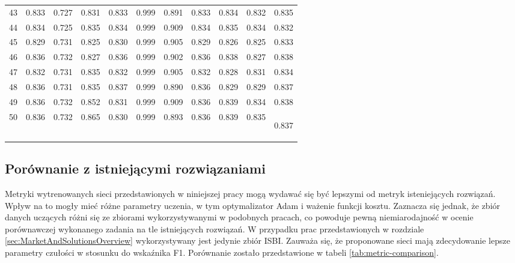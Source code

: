 \begin{longtable}[p]{|c|c|c|c|c|c|c|c|c|c|c|}
	43 & 0.833 & 0.727 & 0.831 & 0.833 & 0.999 & 0.891 & 0.833 & 0.834 & 0.832 & 0.835\\
	44 & 0.834 & 0.725 & 0.835 & 0.834 & 0.999 & 0.909 & 0.834 & 0.835 & 0.834 & 0.832\\
	45 & 0.829 & 0.731 & 0.825 & 0.830 & 0.999 & 0.905 & 0.829 & 0.826 & 0.825 & 0.833\\
	46 & 0.836 & 0.732 & 0.827 & 0.836 & 0.999 & 0.902 & 0.836 & 0.838 & 0.827 & 0.838\\
	47 & 0.832 & 0.731 & 0.835 & 0.832 & 0.999 & 0.905 & 0.832 & 0.828 & 0.831 & 0.834\\
	48 & 0.836 & 0.731 & 0.835 & 0.837 & 0.999 & 0.890 & 0.836 & 0.829 & 0.829 & 0.837\\
	49 & 0.836 & 0.732 & 0.852 & 0.831 & 0.999 & 0.909 & 0.836 & 0.839 & 0.834 & 0.838\\
	50 & 0.836 & 0.732 & 0.865 & 0.830 & 0.999 & 0.893 & 0.836 & 0.839 & 0.835 &0.837

	\label{tab:metrics-bce-20}
\end{longtable}
\subsection{Porównanie z istniejącymi rozwiązaniami}

\par
Metryki wytrenowanych sieci przedstawionych w niniejszej pracy mogą wydawać się być lepszymi od metryk isteniejących rozwiązań. Wpływ na to mogły mieć różne parametry uczenia, w tym optymalizator Adam i ważenie funkcji kosztu. Zaznacza się jednak, że zbiór danych uczących  różni się ze zbiorami wykorzystywanymi w podobnych pracach, co powoduje pewną niemiarodajność w ocenie porównawczej wykonanego zadania na tle istniejących rozwiązań. W przypadku prac przedstawionych w rozdziale \ref{sec:MarketAndSolutionsOverview} wykorzystywany jest jedynie zbiór ISBI. Zauważa się, że proponowane sieci mają zdecydowanie lepsze parametry czułości w stosunku do wskaźnika F1. Porównanie zostało przedstawione w tabeli \ref{tab:metric-comparison}.

